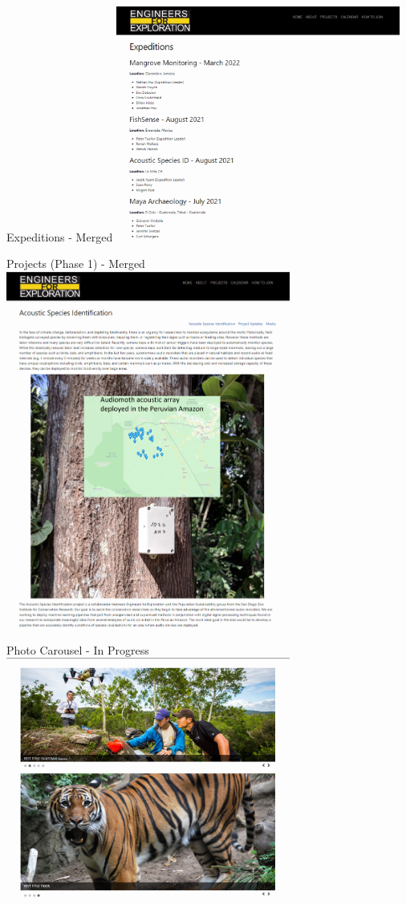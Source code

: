 \begin{frame}{Expeditions - Merged}
    \centering
    \includegraphics[height=0.7\textheight,width=0.7\textwidth,keepaspectratio]{./images/Screenshot 2024-04-29 123255.png}
\end{frame}
\begin{frame}{Projects (Phase 1) - Merged}
    \centering
    \includegraphics[height=0.7\textheight,width=0.7\textwidth,keepaspectratio]{./images/Screenshot 2024-04-29 123500.png}
\end{frame}
\begin{frame}{Photo Carousel - In Progress}
    \centering
    \includegraphics[height=0.7\textheight,width=0.7\textwidth,keepaspectratio]{./images/Screenshot 2024-04-29 123620.png}
\end{frame}
